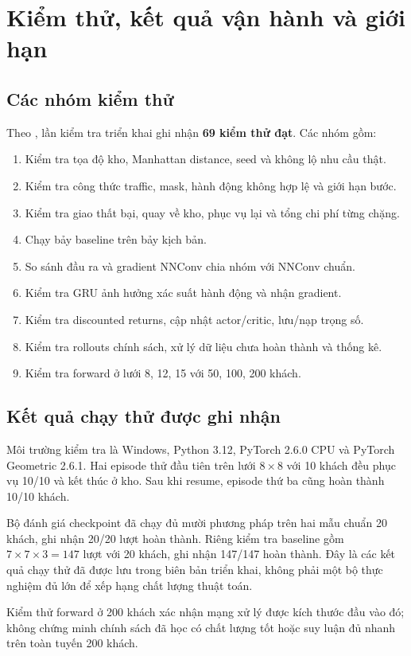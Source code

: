 \documentclass[12pt,a4paper,oneside]{report}
\newcommand{\file}[1]{\texttt{\detokenize{#1}}}
\begin{document}
\chapter{Kiểm thử, kết quả vận hành và giới hạn}
\section{Các nhóm kiểm thử}
Theo \file{VALIDATION.md}, lần kiểm tra triển khai ghi nhận
\textbf{69 kiểm thử đạt}. Các nhóm gồm:
\begin{enumerate}
\item Kiểm tra tọa độ kho, Manhattan distance, seed và không lộ nhu cầu thật.
\item Kiểm tra công thức traffic, mask, hành động không hợp lệ và giới hạn bước.
\item Kiểm tra giao thất bại, quay về kho, phục vụ lại và tổng chi phí từng chặng.
\item Chạy bảy baseline trên bảy kịch bản.
\item So sánh đầu ra và gradient NNConv chia nhóm với NNConv chuẩn.
\item Kiểm tra GRU ảnh hưởng xác suất hành động và nhận gradient.
\item Kiểm tra discounted returns, cập nhật actor/critic, lưu/nạp trọng số.
\item Kiểm tra rollouts chính sách, xử lý dữ liệu chưa hoàn thành và thống kê.
\item Kiểm tra forward ở lưới 8, 12, 15 với 50, 100, 200 khách.
\end{enumerate}

\section{Kết quả chạy thử được ghi nhận}
Môi trường kiểm tra là Windows, Python 3.12, PyTorch 2.6.0 CPU và
PyTorch Geometric 2.6.1. Hai episode thử đầu tiên trên lưới $8\times8$
với 10 khách đều phục vụ 10/10 và kết thúc ở kho. Sau khi resume,
episode thứ ba cũng hoàn thành 10/10 khách.

Bộ đánh giá checkpoint đã chạy đủ mười phương pháp trên hai mẫu chuẩn
20 khách, ghi nhận 20/20 lượt hoàn thành. Riêng kiểm tra baseline gồm
$7\times7\times3=147$ lượt với 20 khách, ghi nhận 147/147 hoàn thành.
Đây là các kết quả chạy thử đã được lưu trong biên bản triển khai,
không phải một bộ thực nghiệm đủ lớn để xếp hạng chất lượng thuật toán.

Kiểm thử forward ở 200 khách xác nhận mạng xử lý được kích thước đầu
vào đó; không chứng minh chính sách đã học có chất lượng tốt hoặc suy
luận đủ nhanh trên toàn tuyến 200 khách.
\end{document}
